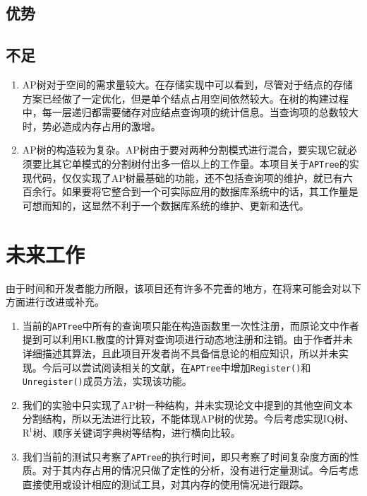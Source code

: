 \documentclass[UTF8]{ctexart}
\begin{document}
\subsection{优势}

\subsection{不足}
\begin{enumerate}
    \item AP树对于空间的需求量较大。在存储实现中可以看到，尽管对于结点的存储方案已经做了一定优化，但是单个结点占用空间依然较大。在树的构建过程中，每一层递归都需要储存对应结点查询项的统计信息。当查询项的总数较大时，势必造成内存占用的激增。
    \item AP树的构造较为复杂。AP树由于要对两种分割模式进行混合，要实现它就必须要比其它单模式的分割树付出多一倍以上的工作量。本项目关于\texttt{APTree}的实现代码，仅仅实现了AP树最基础的功能，还不包括查询项的维护，就已有六百余行。如果要将它整合到一个可实际应用的数据库系统中的话，其工作量是可想而知的，这显然不利于一个数据库系统的维护、更新和迭代。
\end{enumerate}

\section{未来工作}
由于时间和开发者能力所限，该项目还有许多不完善的地方，在将来可能会对以下方面进行改进或补充。
\begin{enumerate}
    \item 当前的\texttt{APTree}中所有的查询项只能在构造函数里一次性注册，而原论文中作者提到可以利用KL散度的计算对查询项进行动态地注册和注销。由于作者并未详细描述其算法，且此项目开发者尚不具备信息论的相应知识，所以并未实现。今后可以尝试阅读相关的文献，在\texttt{APTree}中增加\texttt{Register()}和\texttt{Unregister()}成员方法，实现该功能。
    \item 我们的实验中只实现了AP树一种结构，并未实现论文中提到的其他空间文本分割结构，所以无法进行比较，不能体现AP树的优势。今后考虑实现IQ树、$\mathrm{R^t}$树、顺序关键词字典树等结构，进行横向比较。
    \item 我们当前的测试只考察了\texttt{APTree}的执行时间，即只考察了时间复杂度方面的性质。对于其内存占用的情况只做了定性的分析，没有进行定量测试。今后考虑直接使用或设计相应的测试工具，对其内存的使用情况进行跟踪。
\end{enumerate}

\newpage
\end{document}
